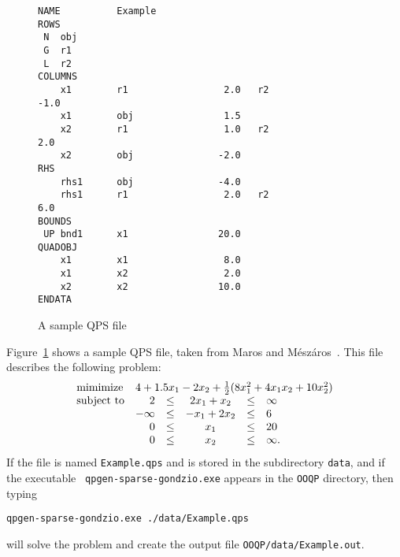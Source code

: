 \begin{figure}[hbt]
\begin{verbatim}
NAME          Example
ROWS
 N  obj
 G  r1
 L  r2
COLUMNS
    x1        r1                 2.0   r2                -1.0
    x1        obj                1.5
    x2        r1                 1.0   r2                 2.0
    x2        obj               -2.0
RHS
    rhs1      obj               -4.0
    rhs1      r1                 2.0   r2                 6.0
BOUNDS
 UP bnd1      x1                20.0
QUADOBJ
    x1        x1                 8.0
    x1        x2                 2.0
    x2        x2                10.0
ENDATA
\end{verbatim}
\caption{A sample QPS file\label{qps-example}} 
\end{figure}
Figure~\ref{qps-example} shows a sample QPS file, taken from Maros and
M\'esz\'aros~\cite{MarM99}.
This file describes the following problem:
\begin{equation}
  \label{qp-example}
  \begin{array}{lrcccl}
    \mathrm{mimimize} & 
    \multicolumn{5}{l}{4 + 1.5 x_1 -2 x_2 + \frac12(8x_1^2 + 
      4x_1 x_2 + 10 x_2^2)} \\
    \mbox{subject to} & 2 & \leq & 2 x_1 +   x_2 & \leq & \infty \\
                      & -\infty  & \leq   & - x_1 + 2 x_2 & \leq & 6 \\
                      & 0 & \leq & x_1         & \leq & 20 \\
                      & 0 & \leq & x_2         & \leq & \infty. \\
  \end{array}
\end{equation}
If the file  is named \texttt{Example.qps} and is
stored in the subdirectory {\tt data}, and if the executable {\tt
qpgen-sparse-gondzio.exe} appears in the {\tt OOQP} directory, then
typing
\begin{verbatim}
qpgen-sparse-gondzio.exe ./data/Example.qps
\end{verbatim}
will solve the problem
and create the output file
\texttt{OOQP/data/Example.out}. 

